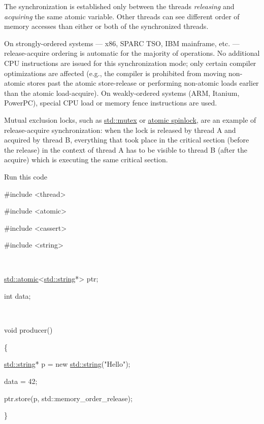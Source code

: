 \documentclass[
]{article}
\begin{document}
The synchronization is established only between the threads
\emph{releasing} and \emph{acquiring} the same atomic variable. Other
threads can see different order of memory accesses than either or both
of the synchronized threads.

On strongly-ordered systems --- x86, SPARC TSO, IBM mainframe, etc. ---
release-acquire ordering is automatic for the majority of operations. No
additional CPU instructions are issued for this synchronization mode;
only certain compiler optimizations are affected (e.g., the compiler is
prohibited from moving non-atomic stores past the atomic store-release
or performing non-atomic loads earlier than the atomic load-acquire). On
weakly-ordered systems (ARM, Itanium, PowerPC), special CPU load or
memory fence instructions are used.

Mutual exclusion locks, such as
\href{https://en.cppreference.com/w/cpp/thread/mutex}{std::mutex} or
\href{https://en.cppreference.com/w/cpp/atomic/atomic_flag}{atomic
spinlock}, are an example of release-acquire synchronization: when the
lock is released by thread A and acquired by thread B, everything that
took place in the critical section (before the release) in the context
of thread A has to be visible to thread B (after the acquire) which is
executing the same critical section.

Run this code

\#include \textless thread\textgreater{}

\#include \textless atomic\textgreater{}

\#include \textless cassert\textgreater{}

\#include \textless string\textgreater{}

~

\href{http://en.cppreference.com/w/cpp/atomic/atomic}{std::atomic}\textless{}\href{http://en.cppreference.com/w/cpp/string/basic_string}{std::string}*\textgreater{}
ptr;

int data;

~

void producer()

\{

\href{http://en.cppreference.com/w/cpp/string/basic_string}{std::string}*
p = new
\href{http://en.cppreference.com/w/cpp/string/basic_string}{std::string}("Hello");

data = 42;

ptr.store(p, std::memory\_order\_release);

\}

~
\end{document}
